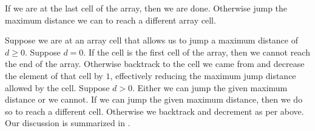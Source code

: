 If we are at the last cell of the array, then we are done.  Otherwise
jump the maximum distance we can to reach a different array cell.

Suppose we are at an array cell that allows us to jump a maximum
distance of $d \geq 0$.  Suppose $d = 0$.  If the cell is the first
cell of the array, then we cannot reach the end of the array.
Otherwise backtrack to the cell we came from and decrease the element
of that cell by $1$, effectively reducing the maximum jump distance
allowed by the cell.  Suppose $d > 0$.  Either we can jump the given
maximum distance or we cannot.  If we can jump the given maximum
distance, then we do so to reach a different cell.  Otherwise we
backtrack and decrement as per above.  Our discussion is summarized in
.

\begin{algorithm}[!htbp]

\caption{%
  Greedy array jump.
}
\label{alg:jump:array_jumping_game}
\end{algorithm}
